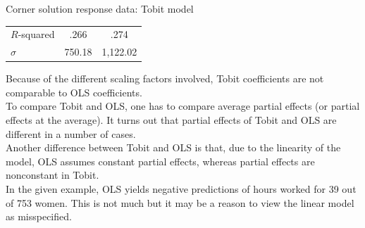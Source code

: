 \documentclass[usenames,dvipsnames]{beamer}
\begin{document}
\begin{frame}{Corner solution response data: Tobit model}
\begin{minipage}[t]{.48\textwidth}
\begin{table}[]
{\begin{tabular}{lcc}
$R$-squared                                                              & .266                            & .274                           \\ 
$\hat{\sigma}$                                                           & 750.18                          & 1,122.02                       \\ \hline
\end{tabular}%
}
\end{table}
\end{minipage}
\hspace*{0.1mm}
\begin{minipage}[t]{.48\textwidth}
{\scriptsize
Because of the different scaling factors involved, Tobit coefficients are not comparable to OLS coefficients.\\

To compare Tobit and OLS, one has to compare average partial effects (or partial effects at the average). It turns out that partial effects of Tobit and OLS are different in a number of cases.\\

Another difference between Tobit and OLS is that, due to the linearity of the model, OLS assumes constant partial effects, whereas partial effects are nonconstant in Tobit.\\

In the given example, OLS yields negative predictions of hours worked for 39 out of 753 women. This is not much but it may be a reason to view the linear model as misspecified.\\

}
\end{minipage}
\end{frame}
\end{document}
